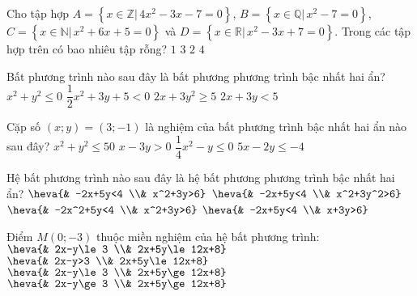 \begin{ex}
	Cho tập hợp $A=\left\{ x\in \mathbb{Z}|\,4x^2-3x-7=0 \right\}$, $B=\left\{ x\in \mathbb{Q}|\,x^2-7=0 \right\}$, $C=\left\{ x\in \mathbb{N}|\,x^2+6x+5=0 \right\}$ và $D=\left\{ x\in \mathbb{R}|\,x^2-3x+7=0 \right\}$. Trong các tập hợp trên có bao nhiêu tập rỗng?
	\choice
	{$1$}
	{\True $3$}
	{$2$}
	{$4$}
\end{ex}
\begin{ex}
	Bất phương trình nào sau đây là bất phương phương trình bậc nhất hai ẩn?
	\choice
	{$x^2+y^2\le 0$}
	{$\dfrac{1}{2}x^2+3y+5<0$}
	{$2x+3y^2\ge 5$}
	{\True $2x+3y<5$}
	\loigiai{

	}
\end{ex}
\begin{ex}
	Cặp số $(x;y)=(3;-1)$ là nghiệm của bất phương trình bậc nhất hai ẩn nào sau đây?
	\choice
	{$x^2+y^2\le 50$}
	{\True $x-3y>0$}
	{$\dfrac{1}{4}x^2-y\le 0$}
	{$5x-2y\le -4$}
\end{ex}
\begin{ex}
	Hệ bất phương trình nào sau đây là hệ bất phương phương trình bậc nhất hai ẩn?
	\choice
	{$\heva{& -2x+5y<4 \\& x^2+3y>6}$}
	{$\heva{& -2x+5y<4 \\& x^2+3y^2>6}$}
	{$\heva{& -2x^2+5y<4 \\& x^2+3y>6}$}
	{\True $\heva{& -2x+5y<4 \\& x+3y>6}$}
\end{ex}
\begin{ex}
	Điểm $M(0;-3)$ thuộc miền nghiệm của hệ bất phương trình:
	\choice
	{\True $\heva{& 2x-y\le 3 \\& 2x+5y\le 12x+8}$}
	{$\heva{& 2x-y>3 \\& 2x+5y\le 12x+8}$}
	{$\heva{& 2x-y\le 3 \\& 2x+5y\ge 12x+8}$}
	{$\heva{& 2x-y\ge 3 \\& 2x+5y\ge 12x+8}$}
\end{ex}
